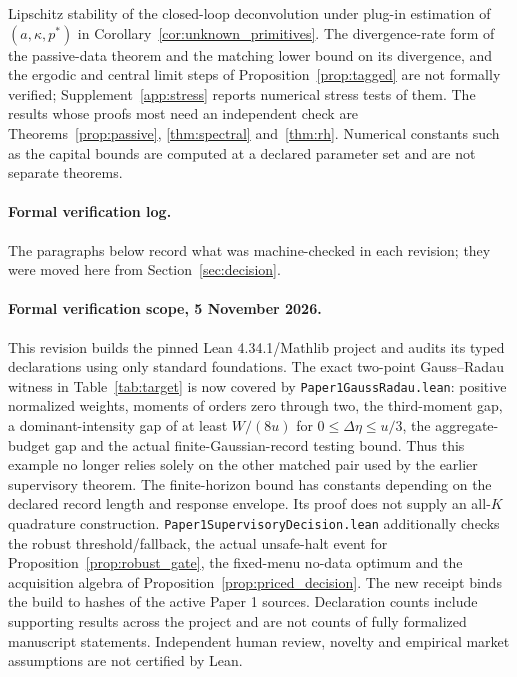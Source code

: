 \documentclass[12pt]{article}
\theoremstyle{definition}
\theoremstyle{remark}
\begin{document}
Lipschitz stability of the closed-loop deconvolution under plug-in estimation of $(a,\kappa,p^*)$ in Corollary~\ref{cor:unknown_primitives}. The divergence-rate form of the passive-data theorem and the matching lower bound on its divergence, and the ergodic and central limit steps of Proposition~\ref{prop:tagged} are not formally verified; Supplement~\ref{app:stress} reports numerical stress tests of them. The results whose proofs most need an independent check are Theorems~\ref{prop:passive}, \ref{thm:spectral} and~\ref{thm:rh}. Numerical constants such as the capital bounds are computed at a declared parameter set and are not separate theorems.

\paragraph{Formal verification log.} The paragraphs below record what was machine-checked in each revision; they were moved here from Section~\ref{sec:decision}.

\paragraph{Formal verification scope, 5 November 2026.} This revision builds the pinned Lean 4.34.1/Mathlib project and audits its typed declarations using only standard foundations. The exact two-point Gauss--Radau witness in Table~\ref{tab:target} is now covered by \nolinkurl{Paper1GaussRadau.lean}: positive normalized weights, moments of orders zero through two, the third-moment gap, a dominant-intensity gap of at least $W/(8u)$ for $0\le\Delta\eta\le u/3$, the aggregate-budget gap and the actual finite-Gaussian-record testing bound. Thus this example no longer relies solely on the other matched pair used by the earlier supervisory theorem. The finite-horizon bound has constants depending on the declared record length and response envelope. Its proof does not supply an all-$K$ quadrature construction. \nolinkurl{Paper1SupervisoryDecision.lean} additionally checks the robust threshold/fallback, the actual unsafe-halt event for Proposition~\ref{prop:robust_gate}, the fixed-menu no-data optimum and the acquisition algebra of Proposition~\ref{prop:priced_decision}. The new receipt binds the build to hashes of the active Paper 1 sources. Declaration counts include supporting results across the project and are not counts of fully formalized manuscript statements. Independent human review, novelty and empirical market assumptions are not certified by Lean.
\end{document}
